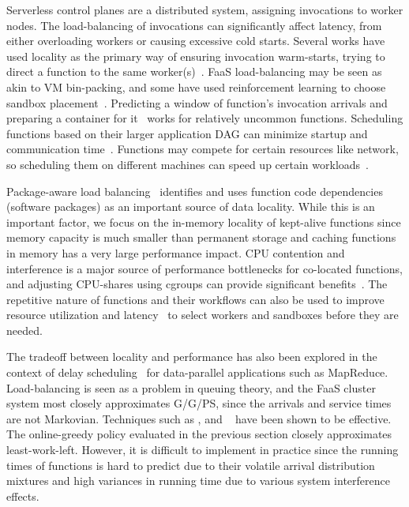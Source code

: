 Serverless control planes are a distributed system, assigning invocations to worker nodes.
The load-balancing of invocations can significantly affect latency, from either overloading workers or causing excessive cold starts. 
Several works have used locality as the primary way of ensuring invocation warm-starts, trying to direct a function to the same worker(s)~\cite{package-cristina-19, leegreedy}.
FaaS load-balancing may be seen as akin to VM bin-packing, and some have used reinforcement learning to choose sandbox placement~\cite{balaji2021fireplace}.
Predicting a window of function's invocation arrivals and preparing a container for it~\cite{shahrad2020serverless} works for relatively uncommon functions.
Scheduling functions based on their larger application DAG can minimize startup and communication time~\cite{shen2021defuse, abdi2023palette, guo_decomposing_2022, kotni2021faastlane, shen_defuse_2021,mahgoub_wisefuse_2022,zhou_qos-aware_2022}.
Functions may compete for certain resources like network, so scheduling them on different machines can speed up certain workloads~\cite{tian_owl_2022}.

Package-aware load balancing~\cite{package-cristina-19} identifies and uses function code dependencies (software packages) as an important source of data locality.
While this is an important factor, we focus on the in-memory locality of kept-alive functions since memory capacity is much smaller than permanent storage and caching functions in memory has a very large performance impact.
CPU contention and interference is a major source of performance bottlenecks for co-located functions, and adjusting CPU-shares using cgroups can provide significant benefits~\cite{suresh2019fnsched, suresh2021servermore, ensure-faas-acsos20}.
The repetitive nature of functions and their workflows can also be used to improve resource utilization and latency~\cite{hunhoff2020proactive, yu2021faasrank, puru_xanadu_20, przybylski2021data} to select workers and sandboxes before they are needed. %


The tradeoff between locality and performance has also been explored in the context of delay scheduling~\cite{zaharia2010delay} for data-parallel applications such as MapReduce.
Load-balancing is seen as a  problem in queuing theory, and the FaaS cluster system most closely approximates G/G/PS, since the arrivals and service times are not Markovian.
Techniques such as , and ~\cite{gupta2007analysis} have been shown to be effective.
The online-greedy policy evaluated in the previous section closely approximates least-work-left.
However, it is difficult to implement in practice since the running times of functions is hard to predict due to their volatile arrival distribution mixtures and high variances in running time due to various system interference effects.


